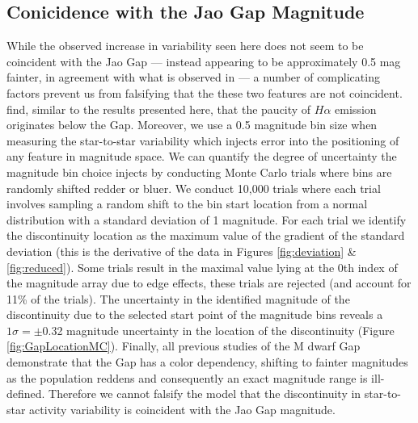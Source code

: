 \subsection{Conicidence with the Jao Gap Magnitude}\label{sec:coincident}
While the observed increase in variability seen here does not seem to be
coincident with the Jao Gap --- instead appearing to be approximately 0.5 mag
fainter, in agreement with what is observed in \citet{Jao2023} --- a number of
complicating factors prevent us from falsifying that the these two features are
not coincident. \citeauthor{Jao2023} find, similar to the results presented
here, that the paucity of $H\alpha$ emission originates below the Gap.
Moreover, we use a 0.5 magnitude bin size when measuring the star-to-star
variability which injects error into the positioning of any feature in
magnitude space. We can quantify the degree of uncertainty the magnitude bin
choice injects by conducting Monte Carlo trials where bins are randomly shifted
redder or bluer. We conduct 10,000 trials where each trial involves sampling a
random shift to the bin start location from a normal distribution with a
standard deviation of 1 magnitude. For each trial we identify the discontinuity
location as the maximum value of the gradient of the standard deviation (this
is the derivative of the data in Figures \ref{fig:deviation} \&
\ref{fig:reduced}). Some trials result in the maximal value lying at the 0th
index of the magnitude array due to edge effects, these trials are rejected
(and account for 11\% of the trials). The uncertainty in the identified
magnitude of the discontinuity due to the selected start point of the magnitude
bins reveals a $1\sigma = \pm$0.32 magnitude uncertainty in the location of the
discontinuity (Figure \ref{fig:GapLocationMC}). Finally, all previous studies
of the M dwarf Gap \citep{Jao2018, Jao2021, Mansfield2021, Boudreaux2022,
Jao2023} demonstrate that the Gap has a color dependency, shifting to fainter
magnitudes as the population reddens and consequently an exact magnitude range
is ill-defined. Therefore we cannot falsify the model that the discontinuity in
star-to-star activity variability is coincident with the Jao Gap magnitude.

